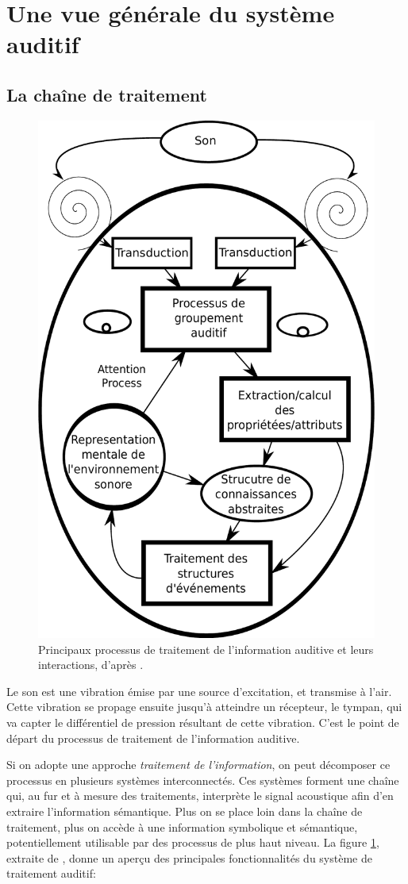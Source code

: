 \section{Une vue générale du système auditif}
\label{sec:ch3_generalViewAudition}

\subsection{La chaîne de traitement}
\label{sec:ch3_chaineTraite}

\begin{figure}[t]
        \myfloatalign
        \includegraphics[width=.6\linewidth]{gfx/ch_3/traitementSonMcAdamsBigand}
        \caption[Principaux processus de traitement de l'information auditive et leurs interactions.]{Principaux processus de traitement de l'information auditive et leurs interactions, d'après \citep{mcadams1994penser}.}\label{fig:traitementSonMcAdamsBigand}
\end{figure}

Le son est une vibration émise par une source d'excitation, et transmise à l'air. Cette vibration se propage ensuite jusqu'à atteindre un récepteur, le tympan, qui va capter le différentiel de pression résultant de cette vibration. C'est le point de départ du processus de traitement de l'information auditive. 

Si on adopte une approche \emph{traitement de l'information}, on peut décomposer ce processus en plusieurs systèmes interconnectés. Ces systèmes forment une chaîne qui, au fur et à mesure des traitements, interprète le signal acoustique afin d'en extraire l'information sémantique. Plus on se place loin dans la chaîne de traitement, plus on accède à une information symbolique et sémantique, potentiellement utilisable par des processus de plus haut niveau. La figure \ref{fig:traitementSonMcAdamsBigand}, extraite de \citep{mcadams1994penser}, donne un aperçu des principales fonctionnalités du système de traitement auditif:

